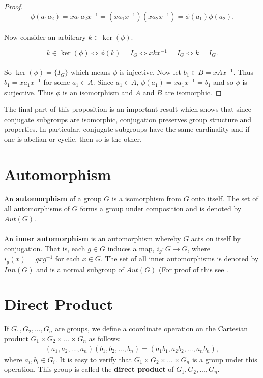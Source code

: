 \begin{remark}
\begin{proof}
\begin{equation*}
\phi(a_1a_2) = x a_1 a_2 x^{-1} = ( xa_1x^{-1})( xa_2x^{-1}) = \phi(a_1) \phi(a_2).
\end{equation*}
\\
Now consider an arbitrary $k \in \ker(\phi)$.

\begin{equation*}
k \in \ker(\phi) \iff \phi(k) = I_G \iff  xkx^{-1} = I_G \iff k = I_G.
\end{equation*}
\\
So $\ker(\phi) = \{ I_G \}$ which means $\phi$ is injective. Now let $b_1 \in B = xAx^{-1}$. Thus $b_1 = xa_1x^{-1}$ for some $a_1 \in A$. Since $a_1 \in A$, $\phi(a_1) = xa_1x^{-1} = b_1$ and so $\phi$ is surjective. Thus $\phi$ is an isomorphism and $A$ and $B$ are isomorphic.

\end{proof}

The final part of this proposition is an important result which shows that since conjugate subgroups are isomorphic, conjugation preserves group structure and properties. In particular, conjugate subgroups have the same cardinality and if one is abelian or cyclic, then so is the other.

\section{Automorphism}

\begin{definition} An \textbf{automorphism} of a group $G$ is a isomorphism from $G$ onto itself. The set of all automorphisms of $G$ forms a group under composition and is denoted by $Aut(G)$.\\
\\
An \textbf{inner automorphism} is an automorphism whereby $G$ acts on itself by conjugation. That is, each $g \in G$ induces a map, $i_g : G \rightarrow G$, where $i_g(x) = g x g^{-1}$ for each $x \in G$. The set of all inner automorphisms is denoted by $Inn(G)$ and is a normal subgroup of $Aut(G)$ (For proof of this see \cite[p.104]{bhattacharya}.
\end{definition}

\section{Direct Product}

\begin{definition} If $G_1, G_2,...,G_n$ are groups, we define a coordinate operation on the Cartesian product $G_1 \times G_2 \times...\times G_n$ as follows:
\begin{align*} (a_1, a_2, ..., a_n) (b_1, b_2, ..., b_n) = (a_1 b_1, a_2 b_2, ..., a_n b_n),
\end{align*}
where $a_i, b_i \in G_i$. It is easy to verify that $G_1 \times G_2 \times...\times G_n$ is a group under this operation. This group is called the \textbf{direct product} of $G_1, G_2,...,G_n$.
\end{definition}


\end{remark}
